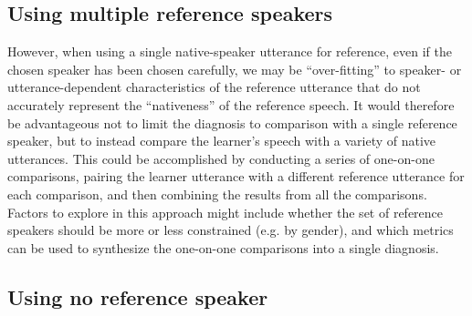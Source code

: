 	\subsection{Using multiple reference speakers}
	\label{sec:compare:multi}
	
	However, when using a single native-speaker utterance for reference, even if the chosen speaker has been chosen carefully, we may be ``over-fitting'' to speaker- or utterance-dependent characteristics of the reference utterance that do not accurately represent the ``nativeness'' of the reference speech. It would therefore be advantageous not to limit the diagnosis to comparison with a single reference speaker, but to instead compare the learner's speech with a variety of native utterances. This could be accomplished by conducting a series of one-on-one comparisons, pairing the learner utterance with a different reference utterance for each comparison, and then combining the results from all the comparisons.  Factors to explore in this approach might include whether the set of reference speakers should be more or less constrained (e.g. by gender), and which metrics can be used to synthesize the one-on-one comparisons into a single diagnosis.
	

	\subsection{Using no reference speaker}
	\label{sec:compare:noref}
	
